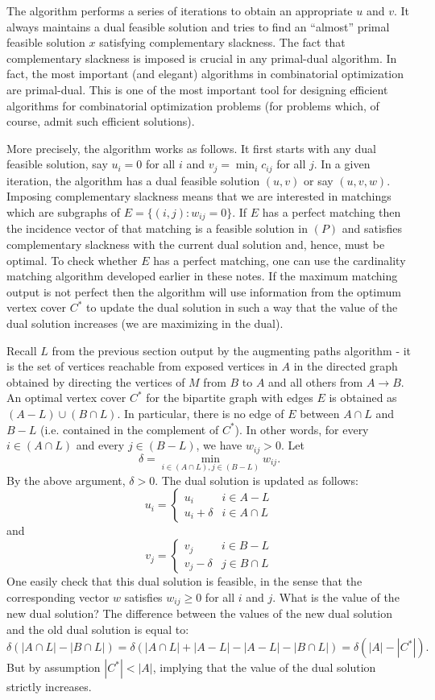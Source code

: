 \documentclass[12pt]{article}
\begin{document}
The algorithm performs a series of iterations to obtain an appropriate
$u$ and $v$. It always maintains a
dual feasible solution and tries to find an ``almost'' primal feasible
solution $x$ satisfying complementary slackness. The fact that
complementary slackness is imposed is crucial in any primal-dual
algorithm. In fact, the most important (and elegant) algorithms in
combinatorial optimization are primal-dual. This is one of the most
important tool for designing efficient algorithms for combinatorial
optimization problems (for problems which, of course, admit such
efficient solutions).

More precisely, the algorithm works as follows. It first starts with
any dual feasible solution, say $u_i=0$ for all $i$ and $v_j=\min_i
c_{ij}$ for all $j$. In a given iteration, 
the algorithm has a dual feasible solution $(u,v)$ or say $(u,v,w)$.
Imposing complementary slackness means that we are interested in
matchings which are subgraphs of $E=\{(i,j): w_{ij}=0\}$. If $E$ has a perfect
matching then the incidence vector of that matching is a feasible
solution in $(P)$ and satisfies complementary slackness with the
current dual solution and, hence, must be optimal. To check whether
$E$ has a perfect matching, one can use the cardinality matching
algorithm developed earlier in these notes. If the maximum matching
output is not perfect then the algorithm will use information from the
optimum vertex cover $C^*$ to update the dual solution in such a way that
the value of the dual solution increases (we are maximizing in the
dual). 

Recall $L$ from the previous section output by the augmenting paths algorithm - it is the set of vertices reachable from exposed vertices in $A$ in the directed graph obtained by directing the vertices of $M$ from $B$ to $A$ and all others from $A \to B$. An optimal vertex cover $C^*$ for the bipartite graph with edges $E$ is obtained as $(A - L ) \cup (B \cap L)$. In particular, there is no
edge of $E$ between $A\cap L$ and $B-L$ (i.e. contained in the complement of $C^*$). In other words, for every
$i\in (A\cap L)$ and every $j\in (B-L)$, we have $w_{ij}>0$.  Let
$$\delta=\min_{i\in (A\cap L), j\in (B-L)} w_{ij}.$$ By the above
argument, $\delta>0$. The dual solution is updated as follows:
$$u_i=\left\{ \begin{array}{ll} u_i & i\in A-L \\ u_i + \delta & i \in
A\cap L \end{array} \right.$$ and $$v_j=\left\{ \begin{array}{ll} v_j
& i\in B-L \\ v_j - \delta & j \in B\cap L \end{array} \right.$$ One
easily check that this dual solution is feasible, in the sense that
the corresponding vector $w$ satisfies $w_{ij}\geq 0$ for all $i$ and
$j$. What is the value of the new dual solution? The difference
between the values of the new dual solution and the old dual solution
is equal to: $$ \delta (|A\cap L| -|B\cap L|) = \delta (|A \cap L| +
|A-L| - |A-L| - |B\cap L|) = \delta (|A|-|C^*|).$$ But by assumption $|C^*|<|A|$,
implying that the value of the dual solution strictly increases.
\end{document}
